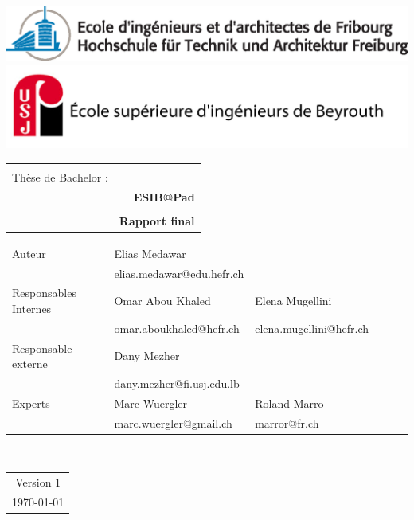\begin{titlepage}
\setlength\topmargin{0in}
\setlength\headheight{-0.3in}
\begin{center}

\includegraphics[width=1\textwidth]{../comon/logos/EIA_couleur.eps}  \\

\includegraphics[width=1\textwidth]{../comon/logos/esib_nom.jpg}  \\[0.5cm] 
\end{center}

\begin{tabular}{p{9cm} r}
\hline \\[1cm]
{ \huge {Thèse de Bachelor : } } &  \\
&  \huge \bfseries  ESIB@Pad  \\[1cm]
\hline \\[0.3cm]
 & \Large \bfseries Rapport final \\

\end{tabular}

\begin{tabular}{l l l l l l}
Auteur & Elias Medawar & \\[0.1cm]
& elias.medawar@edu.hefr.ch & \\[0.5cm]
Responsables Internes  & Omar Abou Khaled & Elena Mugellini  \\[0.1cm]
&omar.aboukhaled@hefr.ch  & elena.mugellini@hefr.ch \\[0.5cm]	
Responsable externe & Dany Mezher & \\[0.1cm]
&dany.mezher@fi.usj.edu.lb   & \\[0.5cm]
Experts & Marc Wuergler  & Roland Marro   \\[.1cm]
&marc.wuergler@gmail.ch & marror@fr.ch \\[1.5cm]	
\end{tabular}
\\
\begin{center}
\begin{tabular}{c}
Version  1 \\[0.5cm]
 {\today} \\[0.5cm]
\end{tabular}
 \end{center}
\end{titlepage}
